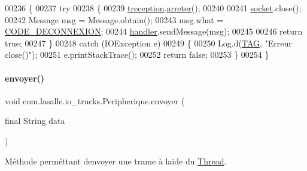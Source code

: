 \begin{DoxyCode}
00236     \{
00237         \textcolor{keywordflow}{try}
00238         \{
00239             \hyperlink{classcom_1_1lasalle_1_1io__trucks_1_1_peripherique_ac1dde247bc593447515e3d7b3ad73550}{treception}.\hyperlink{classcom_1_1lasalle_1_1io__trucks_1_1_peripherique_1_1_t_reception_ad02425d61d6c923521c8f66f6b854b3c}{arreter}();
00240 
00241             \hyperlink{classcom_1_1lasalle_1_1io__trucks_1_1_peripherique_ac5f2ba9eadd31a1f08f745e68476d238}{socket}.close();
00242             Message msg = Message.obtain();
00243             msg.what = \hyperlink{classcom_1_1lasalle_1_1io__trucks_1_1_peripherique_a44d0841cdcad04f7d112cb30d12a60f0}{CODE\_DECONNEXION};
00244             \hyperlink{classcom_1_1lasalle_1_1io__trucks_1_1_peripherique_afc44cb5a50cb29c450ef962efc735532}{handler}.sendMessage(msg);
00245 
00246             \textcolor{keywordflow}{return} \textcolor{keyword}{true};
00247         \}
00248         \textcolor{keywordflow}{catch} (IOException e)
00249         \{
00250             Log.d(\hyperlink{classcom_1_1lasalle_1_1io__trucks_1_1_peripherique_a9ad17604c5e0a0ca93908a76af9db6cc}{TAG}, \textcolor{stringliteral}{"Erreur close()"});
00251             e.printStackTrace();
00252             \textcolor{keywordflow}{return} \textcolor{keyword}{false};
00253         \}
00254     \}
\end{DoxyCode}
\mbox{\label{classcom_1_1lasalle_1_1io__trucks_1_1_peripherique_a7f691381f5164b92f8ff3f06561db656}} 
\paragraph{\texorpdfstring{envoyer()}{envoyer()}}
{\footnotesize\ttfamily void com.\+lasalle.\+io\+\_\+trucks.\+Peripherique.\+envoyer (\begin{DoxyParamCaption}\item[{final String}]{data }\end{DoxyParamCaption})}



Méthode perméttant d\textquotesingle{}envoyer une trame à l\textquotesingle{}aide du \hyperlink{class_thread}{Thread}. 


